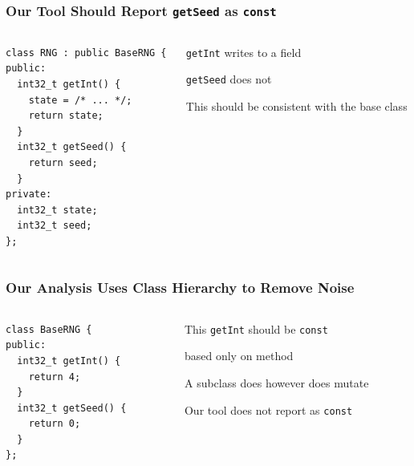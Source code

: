 \documentclass[aspectratio=169]{beamer}
\begin{document}
  \begin{frame}[fragile]
    \frametitle{Our Tool Should Report \texttt{getSeed} as \texttt{const}}

    \begin{columns}
      \begin{column}{0.4\textwidth}
        \begin{lstlisting}
class RNG : public BaseRNG {
public:
  int32_t getInt() {
    state = /* ... */;
    return state;
  }
  int32_t getSeed() {
    return seed;
  }
private:
  int32_t state;
  int32_t seed;
};
        \end{lstlisting}
      \end{column}
      \begin{column}{0.5\textwidth}
        \texttt{getInt} writes to a field

        \vspace{1em}

        \texttt{getSeed} does not 

        \vspace{4em}

        This should be consistent with the base class
      \end{column}
    \end{columns}
  \end{frame}

  \begin{frame}[fragile]
    \frametitle{Our Analysis Uses Class Hierarchy to Remove Noise}
    \begin{columns}
      \begin{column}{0.4\textwidth}
        \begin{lstlisting}
class BaseRNG {
public:
  int32_t getInt() {
    return 4;
  }
  int32_t getSeed() {
    return 0;
  }
};
        \end{lstlisting}
      \end{column}
      \begin{column}{0.5\textwidth}
        This \texttt{getInt} should be \texttt{const}

        \hspace{1em} based only on method

        \vspace{2em}

        A subclass does however does mutate

        \hspace{1em} Our tool does not report as \texttt{const}
      \end{column}
    \end{columns}
  \end{frame}
\end{document}
